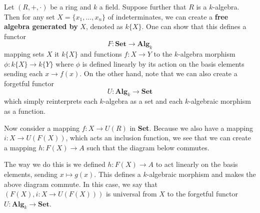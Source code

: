     \begin{example}\label{example_free_algebra_universal}
        Let $(R, +, \cdot)$ be a ring and $k$ a field. Suppose further that 
        $R$ is a $k$-algebra. Then for any set $X = \{x_1, \dots, x_n\}$ of indeterminates, 
        we can create a \textbf{free algebra generated by} $X$, denoted as 
        $k\{X\}$. One can show that this defines a functor 
        \[
            F: \textbf{Set} \to \textbf{Alg}_k
        \]
        mapping sets $X$ it $k\{X\}$ and functions $f: X \to Y$ to 
        the $k$-algebra morphism $\phi: k\{X\} \to k\{Y\}$ where $\phi$ 
        is defined linearly by its action on the basis elements sending each $x \to f(x)$. 
        On the other hand, note that we can also create a forgetful functor 
        \[
            U:\textbf{Alg}_k \to \textbf{Set}
        \]
        which simply reinterprets each $k$-algebra as a set and each $k$-algebraic morphism
        as a function. 

        Now consider a mapping $f: X \to U(R)$ in \textbf{Set}. Because we 
        also have a mapping $i: X \to U(F(X))$, which acts an inclusion function,
        we see that we can create a mapping $h: F(X) \to A$ such that the diagram below 
        commutes. 
        \begin{center}
            \hspace{1cm}
        \end{center}
        The way we do this is we defined $h: F(X) \to A$ to act linearly 
        on the basis elements, sending $x \mapsto g(x)$. This defines a $k$-algebraic 
        morphism and makes the above diagram commute. 
        In this case, we say that $(F(X), i: X \to U(F(X)))$ is universal from 
        $X$ to the forgetful functor $U: \textbf{Alg}_k \to \textbf{Set}$. 
    \end{example}

